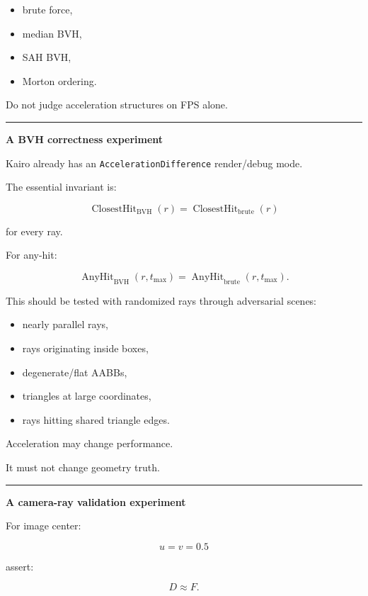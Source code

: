 \begin{itemize}
\tightlist
\item
  brute force,
\item
  median BVH,
\item
  SAH BVH,
\item
  Morton ordering.
\end{itemize}

Do not judge acceleration structures on FPS alone.

\begin{center}\rule{0.5\linewidth}{0.5pt}\end{center}

\textbf{A BVH correctness experiment}

Kairo already has an \texttt{AccelerationDifference} render/debug mode.

The essential invariant is:

\[
\boxed{
\operatorname{ClosestHit}_{\text{BVH}}(r)
=
\operatorname{ClosestHit}_{\text{brute}}(r)
}
\]

for every ray.

For any-hit:

\[
\boxed{
\operatorname{AnyHit}_{\text{BVH}}(r,t_{\max})
=
\operatorname{AnyHit}_{\text{brute}}(r,t_{\max}).
}
\]

This should be tested with randomized rays through adversarial scenes:

\begin{itemize}
\tightlist
\item
  nearly parallel rays,
\item
  rays originating inside boxes,
\item
  degenerate/flat AABBs,
\item
  triangles at large coordinates,
\item
  rays hitting shared triangle edges.
\end{itemize}

Acceleration may change performance.

It must not change geometry truth.

\begin{center}\rule{0.5\linewidth}{0.5pt}\end{center}

\textbf{A camera-ray validation experiment}

For image center:

\[
u=v=0.5
\]

assert:

\[
D\approx F.
\]

